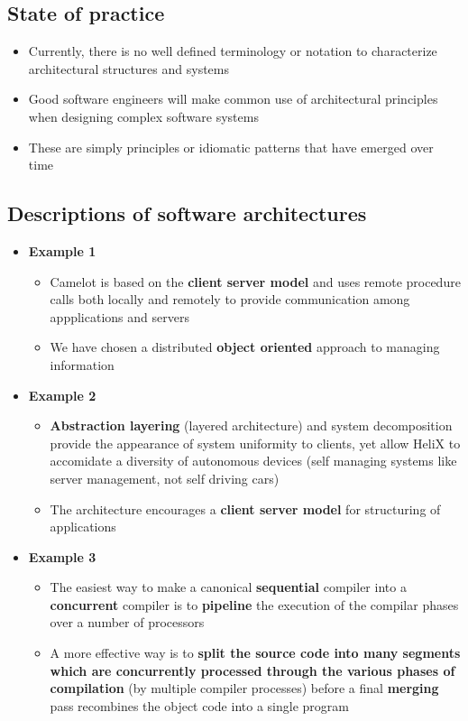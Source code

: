 \documentclass[12pt]{book}
\begin{document}
\subsection*{State of practice}

\begin{itemize}
    \item Currently, there is no well defined terminology or notation to characterize architectural structures and systems
    \item Good software engineers will make common use of architectural principles when designing complex software systems
    \item These are simply principles or idiomatic patterns that have emerged over time
\end{itemize}

\subsection*{Descriptions of software architectures}

\begin{itemize}
    \item \textbf{Example 1}
    \begin{itemize}
        \item Camelot is based on the \textbf{client server model} and uses remote procedure calls both locally and remotely to provide communication among appplications and servers
        \item We have chosen a distributed \textbf{object oriented} approach to managing information
    \end{itemize} 

    \item \textbf{Example 2}
    \begin{itemize}
        \item \textbf{Abstraction layering} (layered architecture) and system decomposition provide the appearance of system uniformity to clients, yet allow HeliX to accomidate a diversity of autonomous devices (self managing systems like server management, not self driving cars)
        \item The architecture encourages a \textbf{client server model} for structuring of applications
    \end{itemize} 

    \item \textbf{Example 3}
    \begin{itemize}
        \item The easiest way to make a canonical \textbf{sequential} compiler into a \textbf{concurrent} compiler is to \textbf{pipeline} the execution of the compilar phases over a number of processors
        \item A more effective way is to \textbf{split the source code into many segments which are concurrently processed through the various phases of compilation} (by multiple compiler processes) before a final \textbf{merging} pass recombines the object code into a single program
    \end{itemize} 
\end{itemize}
\end{document}
